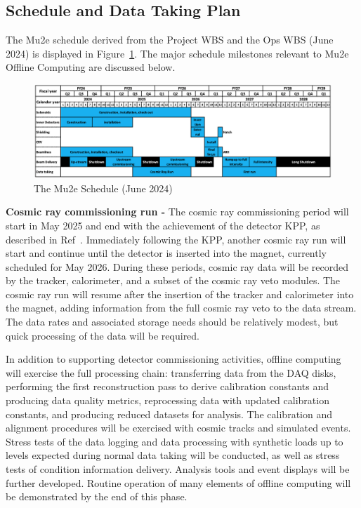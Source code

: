 \subsection{Schedule and Data Taking Plan}
The Mu2e schedule derived from the Project WBS and the Ops WBS (June 2024) is displayed in Figure~\ref{fig:Mu2eRunPlan}. The major schedule milestones relevant to Mu2e Offline Computing are discussed below.
%
\begin{figure}[ht!]
\begin{center}
\includegraphics[width=0.9\linewidth]{figures/Mu2eTimeline2.png}
\caption{The Mu2e Schedule (June 2024)}
\label{fig:Mu2eRunPlan}
\end{center}
\end{figure}
%
{\bf Cosmic ray commissioning run - } The cosmic ray commissioning period will start in May 2025 and end with the achievement of the detector KPP, as described in Ref~\cite{docdb4665}. Immediately following the KPP, another cosmic ray run will start and continue until the detector is inserted into the magnet, currently scheduled for May 2026. During these periods, cosmic ray data will be recorded by the tracker, calorimeter, and a subset of the cosmic ray veto modules. The cosmic ray run will resume after the insertion of the tracker and calorimeter into the magnet, adding information from the full cosmic ray veto to the data stream. The data rates and associated storage needs should be relatively modest, but quick processing of the data will be required. 

In addition to supporting detector commissioning activities, offline computing will exercise the full processing chain: transferring data from the DAQ disks, performing the first reconstruction pass to derive calibration constants and producing data quality metrics, reprocessing data with updated calibration constants, and producing reduced datasets for analysis. The calibration and alignment procedures will be exercised with cosmic tracks and simulated events. Stress tests of the data logging and data processing with synthetic loads up to levels expected during normal data taking will be conducted, as well as stress tests of condition information delivery. Analysis tools and event displays will be further developed. Routine operation of many elements of offline computing will be demonstrated by the end of this phase. 

